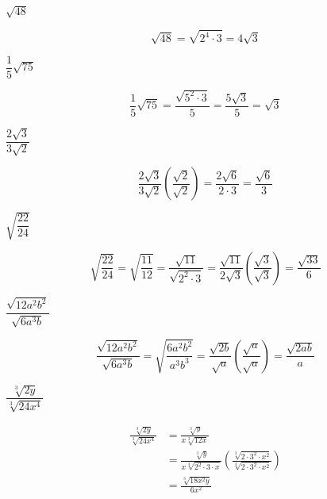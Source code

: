 \documentclass[fleqn,addpoints]{exam}
\begin{document}
\begin{questions}
\question[5] \( \sqrt{48} \)
\label{srf:first}
\begin{solution}[3 cm]
\[
  \sqrt{48} = \sqrt{2^4 \cdot 3} = 4\sqrt{3}
\]
\end{solution}

\question[5] \( \dfrac{1}{5} \sqrt{75} \)
\begin{solution}[3 cm]
\[
  \dfrac{1}{5} \sqrt{75} = \frac{\sqrt{5^2 \cdot 3}}{5} = \frac{5 \sqrt{3}}{5} = \sqrt{3}
\]
\end{solution}

\question[5] \( \dfrac{2 \sqrt{3}}{3 \sqrt{2}} \)
\begin{solution}[3 cm]
\[
  \frac{2 \sqrt{3}}{3 \sqrt{2}} \left( \frac{\sqrt{2}}{\sqrt{2}} \right) = \frac{2 \sqrt{6}}{2 \cdot 3} = \frac{\sqrt{6}}{3}
\]
\end{solution}

\question[5] \( \sqrt{\dfrac{22}{24}} \)
\begin{solution}[3 cm]
\[
  \sqrt{\frac{22}{24}} = \sqrt{\frac{11}{12}} = \frac{\sqrt{11}}{\sqrt{2^2 \cdot 3}} 
  = \frac{\sqrt{11}}{2 \sqrt{3}} \left( \frac{\sqrt{3}}{\sqrt{3}} \right)
  = \frac{\sqrt{33}}{6}
\]
\end{solution}


\question[7] \( \dfrac{\sqrt{12a^2b^2}}{\sqrt{6a^3b}} \)
\begin{solution}[3 cm]
\[
  \frac{\sqrt{12a^2b^2}}{\sqrt{6a^3b}} = \sqrt{\frac{6a^2b^2}{a^3b^3}} 
  = \frac{\sqrt{2b}}{\sqrt{a}} \left( \frac{\sqrt{a}}{\sqrt{a}} \right)
  = \frac{\sqrt{2ab}}{a}
\]
\end{solution}

\question[7] \( \dfrac{\sqrt[3]{2y}}{\sqrt[3]{24x^4}} \)
\label{srf:last}
\begin{solution}[5 cm]
\begin{align*}
  \frac{\sqrt[3]{2y}}{\sqrt[3]{24x^4}} &= \frac{\sqrt[3]{y}}{x \sqrt[3]{12x}} \\
  &= \frac{\sqrt[3]{y}}{x \sqrt[3]{2^2 \cdot 3 \cdot x}} 
      \left( \frac{\sqrt[3]{2 \cdot 3^2 \cdot x^2}}{\sqrt[3]{2 \cdot 3^2 \cdot x^2}} \right) \\
  &= \frac{\sqrt[3]{18x^2y}}{6x^2}
\end{align*}

\end{solution}


\end{questions}
\end{document}
